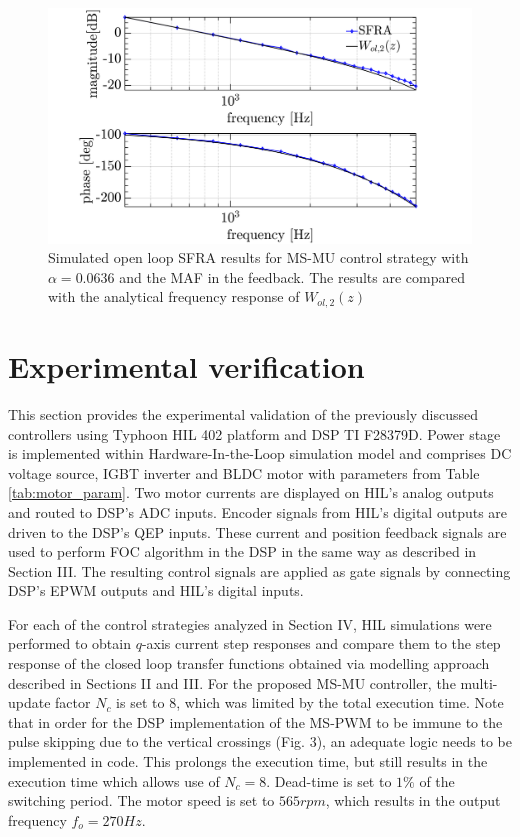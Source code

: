 \documentclass[journal]{IEEEtran}
\begin{document}
\begin{figure}[t!]
    \centerline{\includegraphics[width=1\linewidth]{figures/ivan figs/MSMU_OL_SFRA.png}}
    \caption{Simulated open loop SFRA results for MS-MU control strategy with $\alpha = 0.0636$ and the MAF in the feedback. The results are compared with the analytical frequency response of $W_{ol,2}(z)$ }
    \label{fig:MSMUmaf_olfra} 
\end{figure}


\section{Experimental verification}

This section provides the experimental validation of the previously discussed controllers using Typhoon HIL 402 platform and DSP TI F28379D. Power stage is implemented within Hardware-In-the-Loop simulation model and comprises DC voltage source, IGBT inverter and BLDC motor with parameters from Table \ref{tab:motor_param}. Two motor currents are displayed on HIL’s analog outputs and routed to DSP's ADC inputs. Encoder signals from HIL’s digital outputs are driven to the DSP's QEP inputs. These current and position feedback signals are used to perform FOC algorithm in the DSP in the same way as described in Section III. The resulting control signals are applied as gate signals by connecting DSP’s EPWM outputs and HIL's digital inputs.

For each of the control strategies analyzed in Section IV, HIL simulations were performed to obtain $q$-axis current step responses and compare them to the step response of the closed loop transfer functions obtained via modelling approach described in Sections II and III. For the proposed MS-MU controller, the multi-update factor $N_c$ is set to $8$, which was limited by the total execution time. Note that in order for the DSP implementation of the MS-PWM to be immune to the pulse skipping due to the vertical crossings (Fig. 3), an adequate logic needs to be implemented in code. This prolongs the execution time, but still results in the execution time which allows use of $N_c=8$. Dead-time is set to $1\%$ of the switching period. The motor speed is set to $565rpm$, which results in the output frequency $f_o=270Hz$.
\end{document}
